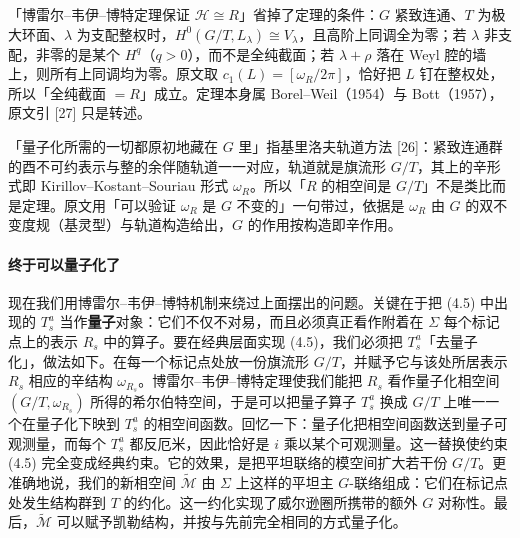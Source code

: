 \begin{yizhu}[含糊点]
「博雷尔–韦伊–博特定理保证 $\mathcal{H}\cong R$」省掉了定理的条件：$G$ 紧致连通、$T$ 为极大环面、$\lambda$ 为支配整权时，$H^{0}(G/T,L_\lambda)\cong V_\lambda$，且高阶上同调全为零；若 $\lambda$ 非支配，非零的是某个 $H^{q}$（$q>0$），而不是全纯截面；若 $\lambda+\rho$ 落在 Weyl 腔的墙上，则所有上同调均为零。原文取 $c_1(L)=[\omega_R/2\pi]$，恰好把 $L$ 钉在整权处，所以「全纯截面 $=R$」成立。定理本身属 Borel--Weil（1954）与 Bott（1957），原文引 [27] 只是转述。
\end{yizhu}

\begin{yizhu}[含糊点]
「量子化所需的一切都原初地藏在 $G$ 里」指基里洛夫轨道方法 [26]：紧致连通群的酉不可约表示与整的余伴随轨道一一对应，轨道就是旗流形 $G/T$，其上的辛形式即 Kirillov--Kostant--Souriau 形式 $\omega_R$。所以「$R$ 的相空间是 $G/T$」不是类比而是定理。原文用「可以验证 $\omega_R$ 是 $G$ 不变的」一句带过，依据是 $\omega_R$ 由 $G$ 的双不变度规（基灵型）与轨道构造给出，$G$ 的作用按构造即辛作用。
\end{yizhu}

\paragraph{终于可以量子化了}
现在我们用博雷尔–韦伊–博特机制来绕过上面摆出的问题。关键在于把 (4.5) 中出现的 $T^{a}_{s}$ 当作\textbf{量子}对象：它们不仅不对易，而且必须真正看作附着在 $\Sigma$ 每个标记点上的表示 $R_s$ 中的算子。要在经典层面实现 (4.5)，我们必须把 $T^{a}_{s}$「去量子化」，做法如下。在每一个标记点处放一份旗流形 $G/T$，并赋予它与该处所居表示 $R_s$ 相应的辛结构 $\omega_{R_s}$。博雷尔–韦伊–博特定理使我们能把 $R_s$ 看作量子化相空间 $(G/T,\omega_{R_s})$ 所得的希尔伯特空间，于是可以把量子算子 $T^{a}_{s}$ 换成 $G/T$ 上唯一一个在量子化下映到 $T^{a}_{s}$ 的相空间函数。回忆一下：量子化把相空间函数送到量子可观测量，而每个 $T^{a}_{s}$ 都反厄米，因此恰好是 $i$ 乘以某个可观测量。这一替换使约束 (4.5) 完全变成经典约束。它的效果，是把平坦联络的模空间扩大若干份 $G/T$。更准确地说，我们的新相空间 $\widetilde{\mathcal{M}}$ 由 $\Sigma$ 上这样的平坦主 $G$-联络组成：它们在标记点处发生结构群到 $T$ 的约化。这一约化实现了威尔逊圈所携带的额外 $G$ 对称性。最后，$\widetilde{\mathcal{M}}$ 可以赋予凯勒结构，并按与先前完全相同的方式量子化。

